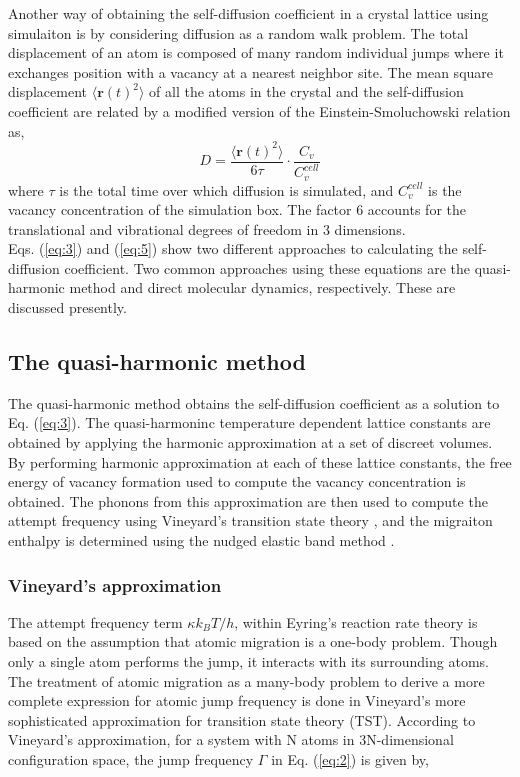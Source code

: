 \documentclass{article}
\begin{document}
Another way of obtaining the self-diffusion coefficient in a crystal lattice using simulaiton is by considering diffusion as a random walk problem. The total displacement of an atom is composed of many random individual jumps where it exchanges position with a vacancy at a nearest neighbor site. The mean square displacement $\langle \bm{r}(t)^2 \rangle$ of all the atoms in the crystal and the self-diffusion coefficient are related by a modified version of the Einstein-Smoluchowski relation \cite{VonSmoluchowski1906} as,
%
\begin{equation} \label{eq:5}
D = \dfrac{\langle \bm{r}(t)^2 \rangle}{6\tau} \cdot \dfrac{C_v}{C_v^{cell}}
\end{equation}
%
where $\tau$ is the total time over which diffusion is simulated, and $C_v^{cell}$ is the vacancy concentration of the simulation box. The factor 6 accounts for the translational and vibrational degrees of freedom in 3 dimensions.\\

Eqs. (\ref{eq:3}) and (\ref{eq:5}) show two different approaches to calculating the self-diffusion coefficient. Two common approaches using these equations are the quasi-harmonic method and direct molecular dynamics, respectively. These are discussed presently.

\subsection{The quasi-harmonic method} 

The quasi-harmonic method obtains the self-diffusion coefficient as a solution to Eq. (\ref{eq:3}). The quasi-harmoninc temperature dependent lattice constants are obtained by applying the harmonic approximation at a set of discreet volumes. By performing harmonic approximation at each of these lattice constants, the free energy of vacancy formation used to compute the vacancy concentration is obtained. The phonons from this approximation are then used to compute the attempt frequency using Vineyard's transition state theory \cite{Vineyard1957}, and the migraiton enthalpy is determined using the nudged elastic band method \cite{Henkelman2000}.

\subsubsection{Vineyard's approximation}

\noindent The attempt frequency term $\kappa k_BT/h$, within Eyring's reaction rate theory is based on the assumption that atomic migration is a one-body problem. Though only a single atom performs the jump, it interacts with its surrounding atoms. The treatment of atomic migration as a many-body problem to derive a more complete expression for atomic jump frequency is done in Vineyard's more sophisticated approximation for transition state theory (TST). According to Vineyard's approximation, for a system with N atoms in 3N-dimensional configuration space, the jump frequency $\Gamma$ in Eq. (\ref{eq:2}) is given by,
\end{document}
